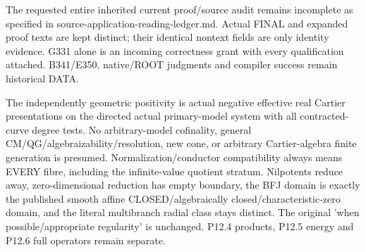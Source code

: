 \documentclass[11pt]{article}
\begin{document}
The requested entire inherited current proof/source audit remains incomplete as specified in source-application-reading-ledger.md. Actual FINAL and expanded proof texts are kept distinct; their identical nontext fields are only identity evidence. G331 alone is an incoming correctness grant with every qualification attached. B341/E350, native/ROOT judgments and compiler success remain historical DATA.

The independently geometric positivity is actual negative effective real Cartier presentations on the directed actual primary-model system with all contracted-curve degree tests. No arbitrary-model cofinality, general CM/QG/algebraizability/resolution, new cone, or arbitrary Cartier-algebra finite generation is presumed. Normalization/conductor compatibility always means EVERY fibre, including the infinite-value quotient stratum. Nilpotents reduce away, zero-dimensional reduction has empty boundary, the BFJ domain is exactly the published smooth affine CLOSED/algebraically closed/characteristic-zero domain, and the literal multibranch radial class stays distinct. The original 'when possible/appropriate regularity' is unchanged. P12.4 products, P12.5 energy and P12.6 full operators remain separate.


\appendix
\end{document}
